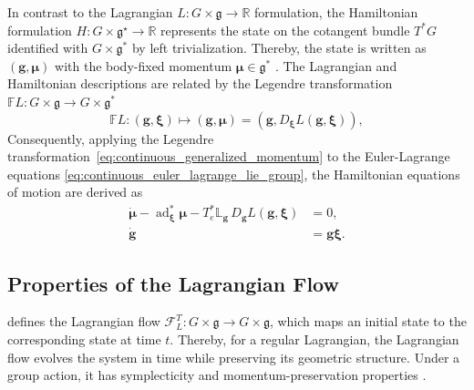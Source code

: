 In contrast to the Lagrangian $L:G\times\mathfrak{g}\to\mathbb{R}$ formulation, the Hamiltonian formulation $H: G \times \mathfrak{g}^\star \to \mathbb{R}$ represents the state on the cotangent bundle $T^*G$ identified with $G \times \mathfrak{g}^*$ by left trivialization. 
Thereby, the state is written as $(\bm{g},\bm{\mu})$ with the body-fixed momentum $\bm{\mu}\in\mathfrak g^*$ \cite{Marsden2001}. 
The Lagrangian and Hamiltonian descriptions are related by the Legendre transformation $\mathbb{F}L:G\times\mathfrak g\rightarrow G\times\mathfrak g^*$
\begin{equation}
    \mathbb{F}L:
    (\bm{g},\bm{\xi})
    \mapsto
    (\bm{g},\bm{\mu})
    =
    \left(
        \bm{g},
        D_{\bm{\xi}}L(\bm{g},\bm{\xi})
    \right),
    \label{eq:continuous_generalized_momentum}
\end{equation}
Consequently, applying the Legendre transformation~\eqref{eq:continuous_generalized_momentum} to the Euler-Lagrange equations \eqref{eq:continuous_euler_lagrange_lie_group}, the Hamiltonian equations of motion are derived as
\begin{subequations}
\label{eq:continuous_hamilton_equations_lie_group}
\begin{align}
    \dot{\bm{\mu}}
    -\operatorname{ad}_{\bm{\xi}}^*\bm{\mu}
    -T_e^*\mathbb{L}_{\bm{g}}\,D_{\bm{g}}L(\bm{g},\bm{\xi})
    &=0,
    \label{eq:continuous_hamilton_momentum_equation}\\
    \dot{\bm{g}}&=\bm{g}\bm{\xi}.
    \label{eq:continuous_hamilton_reconstruction}
\end{align}
\end{subequations}

\subsection{Properties of the Lagrangian Flow}
\label{sec:properties_continuous_lagrangian_flow}

\cite{Marsden2001} defines the Lagrangian flow $\mathcal{F}_L^T:G\times\mathfrak g\rightarrow G\times\mathfrak g$,
which maps an initial state to the corresponding state at time $t$. 
Thereby, for a regular Lagrangian, the Lagrangian flow evolves the system in time while preserving its geometric structure.
Under a group action, it has symplecticity and momentum-preservation properties \cite{Lee2008,Marsden2001}.

